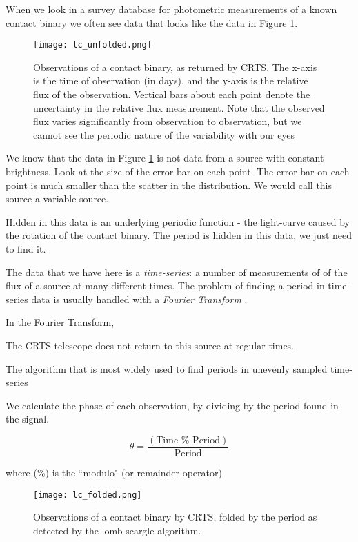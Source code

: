 \documentclass[12pt]{article} %
\numberwithin{equation}{section} %
\begin{document}
When we look in a survey database for photometric measurements of a known contact binary we often see data that looks like the data in Figure \ref{fig: lc_unfolded}. 

\begin{figure}[H]
\centering
\texttt{[image: lc\_unfolded.png]}
\caption{Observations of a contact binary, as returned by CRTS. The x-axis is the time of observation (in days), and the y-axis is the relative flux of the observation. Vertical bars about each point denote the uncertainty in the relative flux measurement. Note that the observed flux varies significantly from observation to observation, but we cannot see the periodic nature of the variability with our eyes}
\label{fig: lc_unfolded}
\end{figure}

We know that the data in Figure \ref{fig: lc_unfolded} is not data from a source with constant brightness. Look at the size of the error bar on each point. The error bar on each point is much smaller than the scatter in the distribution. We would call this source a variable source.


Hidden in this data is an underlying periodic function - the light-curve caused by the rotation of the contact binary. The period is hidden in this data, we just need to find it.

The data that we have here is a \emph{time-series}: a number of measurements of of the flux of a source at many different times. The problem of finding a period in time-series data is usually handled with a \emph{Fourier Transform} .

In the Fourier Transform, 

The CRTS telescope does not return to this source at regular times.

The algorithm that is most widely used to find periods in unevenly sampled time-series \citet{scargle1982studies}

We calculate the phase of each observation, by dividing by the period found in the signal.

\begin{equation} \label{phase_fold}
\theta = \frac{(\text{Time } \% \text{ Period})}{\text{Period}}
\end{equation}

where (\%) is the ``modulo" (or remainder operator)

\begin{figure}[H]
\centering
\texttt{[image: lc\_folded.png]}
\caption{Observations of a contact binary by CRTS, folded by the period as detected by the lomb-scargle algorithm.}
\label{fig: lc_folded}
\end{figure}
\end{document}
